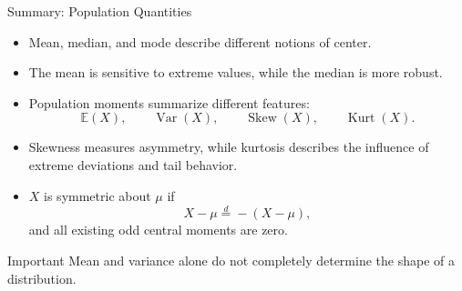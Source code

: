 \begin{frame}{Summary: Population Quantities}

\small

\begin{itemize}
    \item Mean, median, and mode describe different notions of center.

    \item The mean is sensitive to extreme values, while the median is more robust.

    \item Population moments summarize different features:
    \[
    \mathbb{E}(X),\qquad
    \operatorname{Var}(X),\qquad
    \operatorname{Skew}(X),\qquad
    \operatorname{Kurt}(X).
    \]

    \item Skewness measures asymmetry, while kurtosis describes the influence of
    extreme deviations and tail behavior.

    \item  \(X\) is symmetric about \(\mu\) if
    \[
    X-\mu\overset{d}{=}-(X-\mu),
    \]
    and all existing odd central moments are zero.
\end{itemize}

\begin{keybox}{Important}
Mean and variance alone do not completely determine the shape of a distribution.
\end{keybox}

\end{frame}


